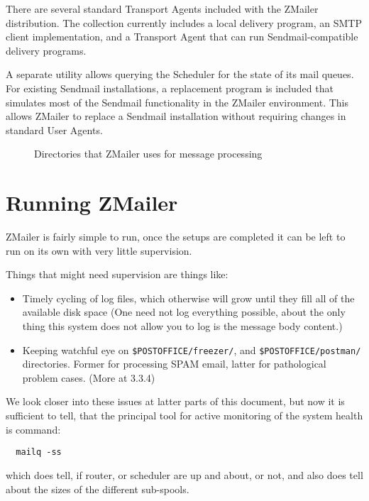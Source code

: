 There are several standard Transport Agents included with the ZMailer
distribution.  The collection currently includes a local delivery program,
an SMTP client implementation, and a Transport Agent that can run
Sendmail-compatible delivery programs.

A separate utility allows querying the Scheduler for the state of its mail
queues.  For existing Sendmail installations, a replacement program is
included that simulates most of the Sendmail functionality in the ZMailer
environment.  This allows ZMailer to replace a Sendmail installation
without requiring changes in standard User Agents.


\begin{figure}[ht]
  \centering
  \caption{\label{fig:zmdirs}Directories that ZMailer uses for message processing}
\end{figure}


\section{Running ZMailer}

ZMailer is fairly simple to run, once the setups are completed
it can be left to run on its own with very little supervision.

Things that might need supervision are things like:
\begin{itemize}
\item Timely cycling of log files, which otherwise will grow until
they fill all of the available disk space  (One need not log
everything possible, about the only thing this system does not
allow you to log is the message body content.)
\item Keeping watchful eye on  {\tt \$POSTOFFICE/freezer/}, and 
{\tt \$POSTOFFICE/postman/}
directories.  Former for processing SPAM email, latter for
pathological problem cases.  (More at  3.3.4)
\end{itemize}

We look closer into these issues at latter parts of this document,
but now it is sufficient to tell, that the principal tool for active
monitoring of the system health is command:
\begin{verbatim}
  mailq -ss
\end{verbatim}

which does tell, if router, or scheduler are up and about, or not,
and also does tell about the sizes of the different sub-spools.

